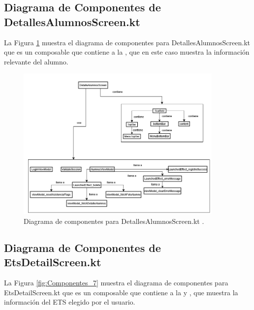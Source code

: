\newpage

\subsection{Diagrama de Componentes de DetallesAlumnosScreen.kt}

La Figura \ref{fig:Componentes_6} muestra el diagrama de componentes para DetallesAlumnosScreen.kt que es un composable que contiene a la , que en este caso muestra la información relevante del alumno.

\begin{figure}[htbp!]
	\begin{center}
		\includegraphics[width=0.9\textwidth]{DiagramasMoviles/DCM (19)}
		\caption{Diagrama de componentes para DetallesAlumnosScreen.kt .}
		\label{fig:Componentes_6}
	\end{center}
\end{figure}

\newpage

\subsection{Diagrama de Componentes de EtsDetailScreen.kt}

La Figura \ref{fig:Componentes_7} muestra el diagrama de componentes para EtsDetailScreen.kt que es un composable que contiene a la  y , que muestra la información del ETS elegido por el usuario.

